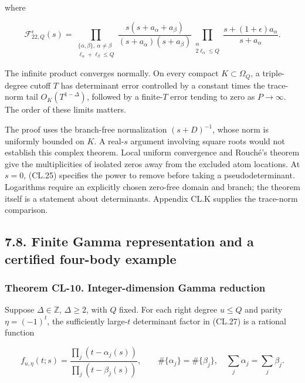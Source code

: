 \documentclass[a4paper,11pt]{article}
\numberwithin{equation}{section}
\begin{document}
where

\[
\mathcal F_{22,Q}^\epsilon(s)=
\prod_{\substack{\{\alpha,\beta\},\ \alpha\ne\beta\\
\ell_\alpha+\ell_\beta\leq Q}}
\frac{s(s+a_\alpha+a_\beta)}{(s+a_\alpha)(s+a_\beta)}
\prod_{\substack{\alpha\\2\ell_\alpha\leq Q}}
\frac{s+(1+\epsilon)a_\alpha}{s+a_\alpha}.
\tag{CL.28}
\]

The infinite product converges normally. On every compact \(K\subset\Omega_Q\), a triple-degree cutoff \(T\) has determinant error controlled by a constant times the trace-norm tail \(O_K(T^{1-\Delta})\), followed by a finite-\(T\) error tending to zero as \(P\to\infty\). The order of these limits matters.

The proof uses the branch-free normalization \((s+D)^{-1}\), whose norm is uniformly bounded on \(K\). A real-\(s\) argument involving square roots would not establish this complex theorem. Local uniform convergence and Rouché's theorem give the multiplicities of isolated zeros away from the excluded atom locations. At \(s=0\), (CL.25) specifies the power to remove before taking a pseudodeterminant. Logarithms require an explicitly chosen zero-free domain and branch; the theorem itself is a statement about determinants. Appendix CL.K supplies the trace-norm comparison.

\hypertarget{finite-gamma-representation-and-a-certified-four-body-example}{%
\subsection{7.8. Finite Gamma representation and a certified four-body example}\label{finite-gamma-representation-and-a-certified-four-body-example}}

\hypertarget{theorem-cl-10.-integer-dimension-gamma-reduction}{%
\subsubsection{Theorem CL-10. Integer-dimension Gamma reduction}\label{theorem-cl-10.-integer-dimension-gamma-reduction}}

Suppose \(\Delta\in\mathbb Z\), \(\Delta\geq2\), with \(Q\) fixed. For each right degree \(u\leq Q\) and parity \(\eta=(-1)^t\), the sufficiently large-\(t\) determinant factor in (CL.27) is a rational function

\[
f_{u,\eta}(t;s)=
\frac{\prod_j(t-\alpha_j(s))}{\prod_j(t-\beta_j(s))},
\qquad
\#\{\alpha_j\}=\#\{\beta_j\},\quad
\sum_j\alpha_j=\sum_j\beta_j.
\tag{CL.29}
\]
\end{document}
